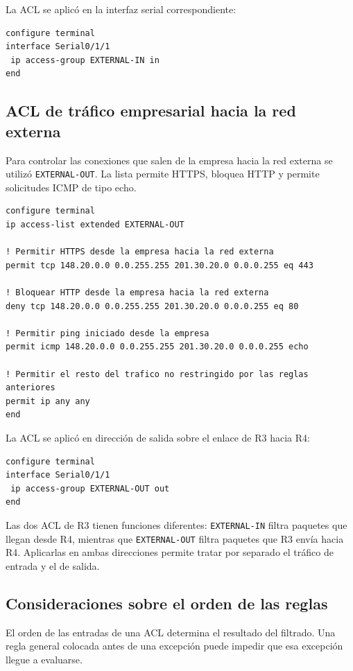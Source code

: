 \documentclass[12pt,a4paper]{article}
\begin{document}
La ACL se aplicó en la interfaz serial correspondiente:

\begin{lstlisting}
configure terminal
interface Serial0/1/1
 ip access-group EXTERNAL-IN in
end
\end{lstlisting}

\subsection{ACL de tráfico empresarial hacia la red externa}

Para controlar las conexiones que salen de la empresa hacia
la red externa se utilizó \texttt{EXTERNAL-OUT}. La lista permite
HTTPS, bloquea HTTP y permite solicitudes ICMP de tipo echo.

\begin{lstlisting}
configure terminal
ip access-list extended EXTERNAL-OUT

! Permitir HTTPS desde la empresa hacia la red externa
permit tcp 148.20.0.0 0.0.255.255 201.30.20.0 0.0.0.255 eq 443

! Bloquear HTTP desde la empresa hacia la red externa
deny tcp 148.20.0.0 0.0.255.255 201.30.20.0 0.0.0.255 eq 80

! Permitir ping iniciado desde la empresa
permit icmp 148.20.0.0 0.0.255.255 201.30.20.0 0.0.0.255 echo

! Permitir el resto del trafico no restringido por las reglas anteriores
permit ip any any
end
\end{lstlisting}

La ACL se aplicó en dirección de salida sobre el enlace de R3 hacia
R4:

\begin{lstlisting}
configure terminal
interface Serial0/1/1
 ip access-group EXTERNAL-OUT out
end
\end{lstlisting}

Las dos ACL de R3 tienen funciones diferentes: \texttt{EXTERNAL-IN}
filtra paquetes que llegan desde R4, mientras que
\texttt{EXTERNAL-OUT} filtra paquetes que R3 envía hacia R4.
Aplicarlas en ambas direcciones permite tratar por separado
el tráfico de entrada y el de salida.

\subsection{Consideraciones sobre el orden de las reglas}

El orden de las entradas de una ACL determina el resultado
del filtrado. Una regla general colocada antes de una excepción
puede impedir que esa excepción llegue a evaluarse.
\end{document}
